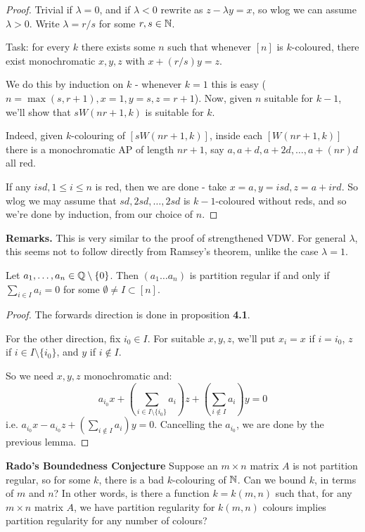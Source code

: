 \documentclass[10pt,a4paper]{article}
\begin{document}
\begin{proof}
  Trivial if $\lambda = 0$, and if $\lambda < 0$ rewrite as $z - \lambda y = x$, so wlog we can assume $\lambda > 0$. Write $\lambda = r/s$ for some $r, s \in \mathbb{N}$.

  Task: for every $k$ there exists some $n$ such that whenever $[n]$ is $k$-coloured, there exist monochromatic $x,y,z$ with $x+(r/s)y = z$.

  We do this by induction on $k$ - whenever $k = 1$ this is easy ($n=\max(s,r+1), x=1, y=s, z=r+1$). Now, given $n$ suitable for $k-1$, we'll show that $sW(nr+1,k)$ is suitable for $k$.

  Indeed, given $k$-colouring of $[sW(nr+1, k)]$, inside each $[W(nr+1, k)]$ there is a monochromatic AP of length $nr+1$, say $a, a+d, a+2d, \ldots, a+(nr)d$ all red.

  If any $isd, 1\leq i \leq n$ is red, then we are done - take $x= a, y=isd, z=a+ird$. So wlog we may assume that $sd, 2sd, \ldots, 2sd$ is $k-1$-coloured without reds, and so we're done by induction, from our choice of $n$.
\end{proof}
\textbf{Remarks.} This is very similar to the proof of strengthened VDW. For general $\lambda$, this seems not to follow directly from Ramsey's theorem, unlike the case $\lambda = 1$.

\begin{theorem}
  Let $a_1, \ldots, a_n \in \mathbb{Q} \setminus \{0\}$. Then $(a_1 \ldots a_n)$ is partition regular if and only if $\sum_{i \in I}a_i = 0$ for some $\emptyset \neq I \subset [n]$.
\end{theorem}
\begin{proof}
  The forwards direction is done in proposition \textbf{4.1}.

  For the other direction, fix $i_0 \in I$. For suitable $x,y,z$, we'll put $x_i = x$ if $i=i_0$, $z$ if $i \in I \setminus \{i_0\}$, and $y$ if $i \notin I$.

  So we need $x,y,z$ monochromatic and:
  \[a_{i_0}x + \left(\sum_{i \in I\setminus \{i_0\}} a_i\right) z +\left(\sum_{i \notin I} a_i\right)y = 0\]
  i.e. $a_{i_0}x - a_{i_0} z + \left(\sum_{i \notin I}a_i\right) y =0$. Cancelling the $a_{i_0}$, we are done by the previous lemma.
\end{proof}
\textbf{Rado's Boundedness Conjecture}
Suppose an $m\times n$ matrix $A$ is not partition regular, so for some $k$, there is a bad $k$-colouring of $\mathbb{N}$. Can we bound $k$, in terms of $m$ and $n$? In other words, is there a function $k = k(m,n)$ such that, for any $m \times n$ matrix $A$, we have partition regularity for $k(m,n)$ colours implies partition regularity for any number of colours?
\end{document}
